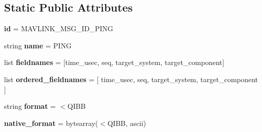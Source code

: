 \subsection*{Static Public Attributes}
\begin{DoxyCompactItemize}
\item 
\mbox{\label{classpymavlink_1_1dialects_1_1v10_1_1MAVLink__ping__message_ac96bdcf4612e2a7ca501b700743fd597}} 
{\bfseries id} = M\+A\+V\+L\+I\+N\+K\+\_\+\+M\+S\+G\+\_\+\+I\+D\+\_\+\+P\+I\+NG
\item 
\mbox{\label{classpymavlink_1_1dialects_1_1v10_1_1MAVLink__ping__message_a746896bed0819bc0be36947d24044b76}} 
string {\bfseries name} = \textquotesingle{}P\+I\+NG\textquotesingle{}
\item 
\mbox{\label{classpymavlink_1_1dialects_1_1v10_1_1MAVLink__ping__message_a52e1ec7923315f460b1ec4d755d2171b}} 
list {\bfseries fieldnames} = \mbox{[}\textquotesingle{}time\+\_\+usec\textquotesingle{}, \textquotesingle{}seq\textquotesingle{}, \textquotesingle{}target\+\_\+system\textquotesingle{}, \textquotesingle{}target\+\_\+component\textquotesingle{}\mbox{]}
\item 
\mbox{\label{classpymavlink_1_1dialects_1_1v10_1_1MAVLink__ping__message_aace74da482a6645090c9e607c6319ed4}} 
list {\bfseries ordered\+\_\+fieldnames} = \mbox{[} \textquotesingle{}time\+\_\+usec\textquotesingle{}, \textquotesingle{}seq\textquotesingle{}, \textquotesingle{}target\+\_\+system\textquotesingle{}, \textquotesingle{}target\+\_\+component\textquotesingle{} \mbox{]}
\item 
\mbox{\label{classpymavlink_1_1dialects_1_1v10_1_1MAVLink__ping__message_ab9c8517f345f86d2328023e3140b7215}} 
string {\bfseries format} = \textquotesingle{}$<$Q\+I\+BB\textquotesingle{}
\item 
\mbox{\label{classpymavlink_1_1dialects_1_1v10_1_1MAVLink__ping__message_a180e04d3e2f11eb5f694d8f893ba6711}} 
{\bfseries native\+\_\+format} = bytearray(\textquotesingle{}$<$Q\+I\+BB\textquotesingle{}, \textquotesingle{}ascii\textquotesingle{})

\end{DoxyCompactItemize}
